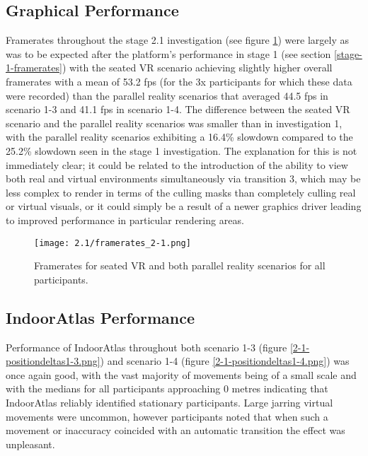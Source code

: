 
\subsection{Graphical Performance}
\label{stage-2-1-framerates}
Framerates throughout the stage 2.1 investigation (see figure \ref{framerates_2-1.png}) were largely as was to be expected after the platform's performance in stage 1 (see section \ref{stage-1-framerates}) with the seated VR scenario achieving slightly higher overall framerates with a mean of 53.2 fps (for the 3x participants for which these data were recorded) than the parallel reality scenarios that averaged 44.5 fps in scenario 1-3 and 41.1 fps in scenario 1-4. The difference between the seated VR scenario and the parallel reality scenarios was smaller than in investigation 1, with the parallel reality scenarios exhibiting a 16.4\% slowdown compared to the 25.2\% slowdown seen in the stage 1 investigation. The explanation for this is not immediately clear; it could be related to the introduction of the ability to view both real and virtual environments simultaneously via transition 3, which may be less complex to render in terms of the culling masks than completely culling real or virtual visuals, or it could simply be a result of a newer graphics driver leading to improved performance in particular rendering areas.

\begin{figure}[h]
	\begin{center}
	\texttt{[image: 2.1/framerates\_2-1.png]}
	\caption{Framerates for seated VR and both parallel reality scenarios for all participants.}
	\label{framerates_2-1.png}
	\end{center}
\end{figure}


\subsection{IndoorAtlas Performance}

Performance of IndoorAtlas throughout both scenario 1-3 (figure \ref{2-1-positiondeltas1-3.png}) and scenario 1-4 (figure \ref{2-1-positiondeltas1-4.png}) was once again good, with the vast majority of movements being of a small scale and with the medians for all participants approaching 0 metres indicating that IndoorAtlas reliably identified stationary participants. Large jarring virtual movements were uncommon, however participants noted that when such a movement or inaccuracy coincided with an automatic transition the effect was unpleasant.

